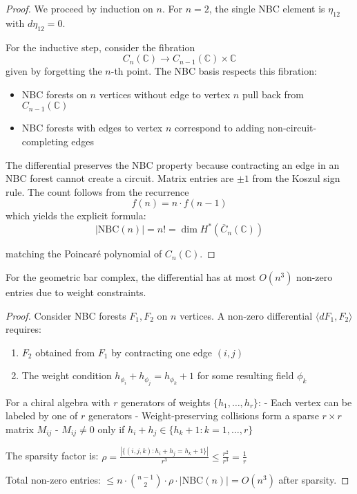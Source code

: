 \begin{proof}
We proceed by induction on $n$. For $n = 2$, the single NBC element is $\eta_{12}$ with $d\eta_{12} = 0$.
 
For the inductive step, consider the fibration
\[
C_n(\mathbb{C}) \to C_{n-1}(\mathbb{C}) \times \mathbb{C}
\]
given by forgetting the $n$-th point. The NBC basis respects this fibration:
\begin{itemize}
\item NBC forests on $n$ vertices without edge to vertex $n$ pull back from $C_{n-1}(\mathbb{C})$
\item NBC forests with edges to vertex $n$ correspond to adding non-circuit-completing edges
\end{itemize}
 
The differential preserves the NBC property because contracting an edge in an NBC forest cannot create a circuit. Matrix entries are $\pm 1$ from the Koszul sign rule. The count follows from the recurrence
\[
f(n) = n \cdot f(n-1)
\]
which yields the explicit formula:
\[
|\text{NBC}(n)| = n! = \dim H^*(\overline{C}_n(\mathbb{C}))
\]

matching the Poincaré polynomial of $C_n(\mathbb{C})$.
\end{proof}

\begin{proposition}\label{prop:nbc-sparsity}
For the geometric bar complex, the differential has at most $O(n^3)$ non-zero entries due to weight constraints.
\end{proposition}

\begin{proof}
Consider NBC forests $F_1, F_2$ on $n$ vertices. A non-zero differential $\langle dF_1, F_2 \rangle$ requires:
\begin{enumerate}
\item $F_2$ obtained from $F_1$ by contracting one edge $(i,j)$
\item The weight condition $h_{\phi_i} + h_{\phi_j} = h_{\phi_k} + 1$ for some resulting field $\phi_k$
\end{enumerate}

For a chiral algebra with $r$ generators of weights $\{h_1, \ldots, h_r\}$:
- Each vertex can be labeled by one of $r$ generators
- Weight-preserving collisions form a sparse $r \times r$ matrix $M_{ij}$
- $M_{ij} \neq 0$ only if $h_i + h_j \in \{h_k + 1 : k = 1, \ldots, r\}$

The sparsity factor is:
$\rho = \frac{|\{(i,j,k) : h_i + h_j = h_k + 1\}|}{r^3} \leq \frac{r^2}{r^3} = \frac{1}{r}$

Total non-zero entries: $\leq n \cdot \binom{n-1}{2} \cdot \rho \cdot |\text{NBC}(n)| = O(n^3)$ after sparsity.
\end{proof}

